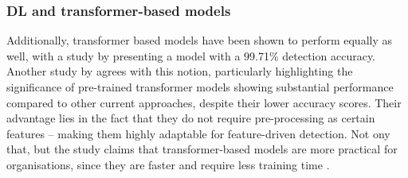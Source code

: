 
\subsubsection*{DL and transformer-based models}
Additionally, transformer based models have been shown to perform equally as well, with a study by \cite{do2024integrated} presenting a model with a 99.71\% detection accuracy. Another study by \cite{shirazi2022towards} agrees with this notion, particularly highlighting the significance of pre-trained transformer models showing substantial performance compared to other current approaches, despite their lower accuracy scores. Their advantage lies in the fact that they do not require pre-processing as certain features -- making them highly adaptable for feature-driven detection. Not ony that, but the study claims that transformer-based models are more practical for organisations, since they are faster and require less training time \citep{shirazi2022towards}.
